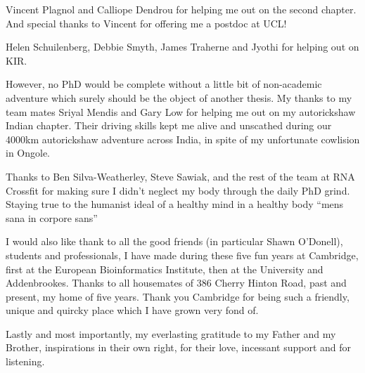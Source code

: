 \begin{acknowledgements}
 Vincent Plagnol and Calliope Dendrou for helping me out on the second chapter.
 And special thanks to Vincent for offering me a postdoc at UCL!

 Helen Schuilenberg, Debbie Smyth, James Traherne and Jyothi for helping out on KIR.

 However, no PhD would be complete without a little bit of non-academic adventure which surely should be the object of another thesis.
 My thanks to my team mates Sriyal Mendis and Gary Low for helping me out on my autorickshaw Indian chapter.
 Their driving skills kept me alive and unscathed during our 4000km autorickshaw adventure across India,
 in spite of my unfortunate cowlision in Ongole.

 Thanks to Ben Silva-Weatherley, Steve Sawiak, and the rest of the team at RNA Crossfit for making
 sure I didn't neglect my body through the daily PhD grind.
 Staying true to the humanist ideal of a healthy mind in a healthy body ``mens sana in corpore sans''

 I would also like thank to all the good friends (in particular Shawn O'Donell), students and professionals, I have made during these five fun years at Cambridge,
 first at the European Bioinformatics Institute, then at the University and Addenbrookes.
 Thanks to all housemates of 386 Cherry Hinton Road, past and present, my home of five years.
 Thank you Cambridge for being such a friendly, unique and quircky place which I have grown very fond of.

 Lastly and most importantly, my everlasting gratitude to my Father and my Brother, inspirations in their own right, for their love, incessant support and for listening.

\end{acknowledgements}
